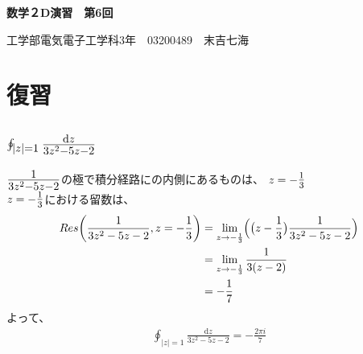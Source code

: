 \documentclass[dvipdfmx,a4paper]{jsarticle}
\begin{document}
\begin{center}
\textbf{\huge{数学２D演習　第6回}}
\end{center}

\begin{flushright}
工学部電気電子工学科3年　03200489　末吉七海\\
\end{flushright}

\section{復習}

\subsection{$\mbox{\Large$\oint_{|z| = 1}\frac{\mathrm{d}z}{3z^2-5z-2}$}$}
$\mbox{\Large$\frac{1}{3z^2-5z-2}$}$の極で積分経路にの内側にあるものは、 $z = -\mbox{\large$\frac{1}{3}$}$\\
$z = -\mbox{\large$\frac{1}{3}$}$における留数は、
\begin{align*}
Res\biggl(\frac{1}{3z^2-5z-2}, z = -\frac{1}{3}\biggr) &= \lim_{z \to -\frac{1}{3}} \Bigl(\bigl(z - \frac{1}{3}\bigr)\frac{1}{3z^2-5z-2}\Bigr)\\
&=\lim_{z \to -\frac{1}{3}} \frac{1}{3(z-2)}\\
&=-\frac{1}{7}
\end{align*}
よって、
\begin{align*}
\oint_{|z| = 1}\frac{\mathrm{d}z}{3z^2-5z-2} =- \frac{2\pi i}{7}
\end{align*}
\\

\end{document}
